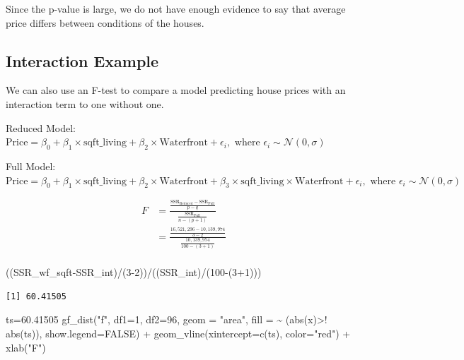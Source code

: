 \documentclass[
  letterpaper,
  DIV=11,
  numbers=noendperiod]{scrreprt}
\newenvironment{Shaded}{\begin{snugshade}}{\end{snugshade}}
\newcommand{\AttributeTok}[1]{\textcolor[rgb]{0.40,0.45,0.13}{#1}}
\newcommand{\ConstantTok}[1]{\textcolor[rgb]{0.56,0.35,0.01}{#1}}
\newcommand{\DecValTok}[1]{\textcolor[rgb]{0.68,0.00,0.00}{#1}}
\newcommand{\FloatTok}[1]{\textcolor[rgb]{0.68,0.00,0.00}{#1}}
\newcommand{\FunctionTok}[1]{\textcolor[rgb]{0.28,0.35,0.67}{#1}}
\newcommand{\NormalTok}[1]{\textcolor[rgb]{0.00,0.23,0.31}{#1}}
\newcommand{\OtherTok}[1]{\textcolor[rgb]{0.00,0.23,0.31}{#1}}
\newcommand{\SpecialCharTok}[1]{\textcolor[rgb]{0.37,0.37,0.37}{#1}}
\newcommand{\StringTok}[1]{\textcolor[rgb]{0.13,0.47,0.30}{#1}}
\begin{document}
Since the p-value is large, we do not have enough evidence to say that
average price differs between conditions of the houses.

\subsection{Interaction Example}\label{interaction-example}

We can also use an F-test to compare a model predicting house prices
with an interaction term to one without one.

Reduced Model:
\(\text{Price}= \beta_0+ \beta_1 \times\text{sqft\_living} + \beta_2\times\text{Waterfront} + \epsilon_i , \text{ where } \epsilon_i\sim\mathcal{N}(0, \sigma)\)

Full Model:
\(\text{Price}= \beta_0+ \beta_1 \times\text{sqft\_living}+ \beta_2\times\text{Waterfront} + \beta_3\times\text{sqft\_living}\times\text{Waterfront} + \epsilon_i , \text{ where } \epsilon_i\sim\mathcal{N}(0, \sigma)\)

\[
\begin{aligned}
F &= \frac{\frac{\text{SSR}_{\text{Reduced}}-\text{SSR}_{\text{Full}}}{p-q}}{\frac{\text{SSR}_{\text{Full}}}{n-(p+1)}} \\
&=\frac{\frac{16,521,296-10,139,974}{3-2}}{\frac{10,139,974}{100-(3+1)}} \\
\end{aligned}
\]

\begin{Shaded}
\begin{Highlighting}[]
\NormalTok{((SSR\_wf\_sqft}\SpecialCharTok{{-}}\NormalTok{SSR\_int)}\SpecialCharTok{/}\NormalTok{(}\DecValTok{3{-}2}\NormalTok{))}\SpecialCharTok{/}\NormalTok{((SSR\_int)}\SpecialCharTok{/}\NormalTok{(}\DecValTok{100}\SpecialCharTok{{-}}\NormalTok{(}\DecValTok{3}\SpecialCharTok{+}\DecValTok{1}\NormalTok{)))}
\end{Highlighting}
\end{Shaded}

\begin{verbatim}
[1] 60.41505
\end{verbatim}

\begin{Shaded}
\begin{Highlighting}[]
\NormalTok{ts}\OtherTok{=}\FloatTok{60.41505}
\FunctionTok{gf\_dist}\NormalTok{(}\StringTok{"f"}\NormalTok{, }\AttributeTok{df1=}\DecValTok{1}\NormalTok{, }\AttributeTok{df2=}\DecValTok{96}\NormalTok{, }\AttributeTok{geom =} \StringTok{"area"}\NormalTok{, }\AttributeTok{fill =} \SpecialCharTok{\textasciitilde{}}\NormalTok{ (}\FunctionTok{abs}\NormalTok{(x)}\SpecialCharTok{\textgreater{}!} \FunctionTok{abs}\NormalTok{(ts)), }\AttributeTok{show.legend=}\ConstantTok{FALSE}\NormalTok{) }\SpecialCharTok{+} \FunctionTok{geom\_vline}\NormalTok{(}\AttributeTok{xintercept=}\FunctionTok{c}\NormalTok{(ts), }\AttributeTok{color=}\StringTok{"red"}\NormalTok{)  }\SpecialCharTok{+} \FunctionTok{xlab}\NormalTok{(}\StringTok{"F"}\NormalTok{)}
\end{Highlighting}
\end{Shaded}
\end{document}
